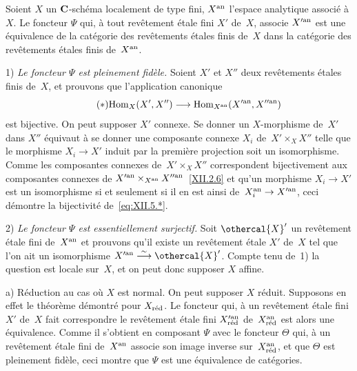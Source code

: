 \begin{theoreme}
\label{XII.5.1}
Soient $X$ un $\mathbf{C}$-sch\'ema localement de type fini, $X^{\mathrm{an}}$
l'espace analytique associ\'e \`a $X$. Le foncteur $\Psi$ qui,
\`a tout rev\^etement \'etale fini $X'$ de~$X$, associe
$X^{\prime\mathrm{an}}$ est une \'equivalence
de la cat\'egorie des rev\^etements \'etales finis de~$X$ dans
la cat\'egorie des rev\^etements \'etales finis de~$X^{\mathrm{an}}$.
\end{theoreme}

1) \emph{Le foncteur $\Psi$ est pleinement fidèle.} Soient $X'$
et $X''$ deux rev\^etements \'etales finis de~$X$, et prouvons que
l'application canonique
\begin{equation*}
\label{eq:XII.5.*}
\tag{$*$} { \Hom_{X}(X',X'') \to
\Hom_{X^{\an}}(X^{\prime\an},X^{\prime\prime\an}) }
\end{equation*}
est bijective. On peut supposer $X'$ connexe. Se donner un
$X$-morphisme de~$X'$ dans $X''$ \'equivaut \`a se donner une
composante connexe $X_{i}$ de~$X'\times_{X}X''$ telle que le morphisme
$X_{i}\to X'$ induit par la premi\`ere projection soit un
isomorphisme. Comme les composantes connexes de~$X'\times_{X}X''$
correspondent bijectivement aux composantes connexes de
$X^{\prime\mathrm{an}}\times_{X^{\mathrm{an}}}X^{\prime\prime\mathrm{an}}$~\eqref{XII.2.6} et qu'un
morphisme $X_{i}\to X'$ est un isomorphisme si et seulement si il en
est ainsi de~$X_{i}^{\an}\to X^{\prime\an}$, ceci d\'emontre la
bijectivit\'e de~\eqref{eq:XII.5.*}.

2) \emph{Le foncteur $\Psi$ est essentiellement surjectif.} Soit
$\othercal{X}'$ un rev\^etement \'etale fini de~$X^{\mathrm{an}}$ et prouvons
qu'il existe un rev\^etement \'etale $X'$ de~$X$ tel que l'on ait
un isomorphisme $X^{\prime\an}\isomto\othercal{X}'$. Compte tenu de~1) la
question est locale sur~$X$, et on peut donc supposer $X$ affine.

a) R\'eduction au cas o\`u $X$ est normal. On peut supposer $X$
r\'eduit. Supposons en effet le th\'eor\`eme d\'emontr\'e
pour $X_{\mathrm{r\acute{e}d}}$. Le foncteur qui, \`a un rev\^etement \'etale
fini $X'$ de~$X$ fait correspondre le rev\^etement \'etale fini
$X^{\prime\mathrm{an}}_{\mathrm{r\acute{e}d}}$ de~$X_{\mathrm{r\acute{e}d}}^{\mathrm{an}}$ est alors une \'equivalence.
Comme il s'obtient en composant $\Psi$ avec le foncteur $\Theta$ qui,
\`a un rev\^etement \'etale fini de~$X^{\mathrm{an}}$ associe son image
inverse sur~$X_{\mathrm{r\acute{e}d}}^{\mathrm{an}}$, et que $\Theta$ est pleinement
fid\`ele, ceci montre que $\Psi$ est une \'equivalence de
cat\'egories.

